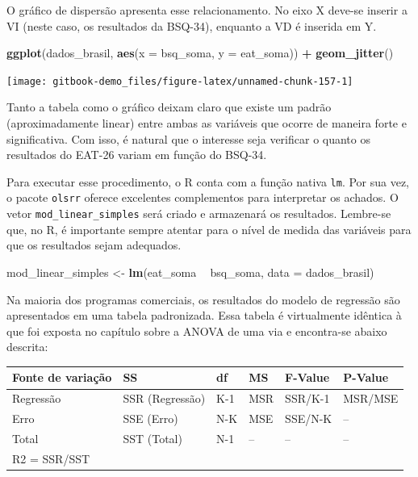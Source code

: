 \documentclass[
]{book}
\newenvironment{Shaded}{\begin{snugshade}}{\end{snugshade}}
\newcommand{\DataTypeTok}[1]{\textcolor[rgb]{0.13,0.29,0.53}{#1}}
\newcommand{\KeywordTok}[1]{\textcolor[rgb]{0.13,0.29,0.53}{\textbf{#1}}}
\newcommand{\NormalTok}[1]{#1}
\newcommand{\OperatorTok}[1]{\textcolor[rgb]{0.81,0.36,0.00}{\textbf{#1}}}
\newcommand{\StringTok}[1]{\textcolor[rgb]{0.31,0.60,0.02}{#1}}
\begin{document}
O gráfico de dispersão apresenta esse relacionamento. No eixo X deve-se inserir a VI (neste caso, os resultados da BSQ-34), enquanto a VD é inserida em Y.

\begin{Shaded}
\begin{Highlighting}[]
\KeywordTok{ggplot}\NormalTok{(dados_brasil, }\KeywordTok{aes}\NormalTok{(}\DataTypeTok{x =}\NormalTok{ bsq_soma, }\DataTypeTok{y =}\NormalTok{ eat_soma)) }\OperatorTok{+}
\StringTok{  }\KeywordTok{geom_jitter}\NormalTok{()}
\end{Highlighting}
\end{Shaded}

\begin{center}\texttt{[image: gitbook-demo\_files/figure-latex/unnamed-chunk-157-1]} \end{center}

Tanto a tabela como o gráfico deixam claro que existe um padrão (aproximadamente linear) entre ambas as variáveis que ocorre de maneira forte e significativa. Com isso, é natural que o interesse seja verificar o quanto os resultados do EAT-26 variam em função do BSQ-34.

Para executar esse procedimento, o R conta com a função nativa \texttt{lm}. Por sua vez, o pacote \texttt{olsrr} oferece excelentes complementos para interpretar os achados. O vetor \texttt{mod\_linear\_simples} será criado e armazenará os resultados. Lembre-se que, no R, é importante sempre atentar para o nível de medida das variáveis para que os resultados sejam adequados.

\begin{Shaded}
\begin{Highlighting}[]
\NormalTok{mod_linear_simples <-}\StringTok{ }\KeywordTok{lm}\NormalTok{(eat_soma }\OperatorTok{~}\StringTok{ }\NormalTok{bsq_soma, }\DataTypeTok{data =}\NormalTok{ dados_brasil)}
\end{Highlighting}
\end{Shaded}

Na maioria dos programas comerciais, os resultados do modelo de regressão são apresentados em uma tabela padronizada. Essa tabela é virtualmente idêntica à que foi exposta no capítulo sobre a ANOVA de uma via e encontra-se abaixo descrita:

\begin{longtable}[]{@{}llllll@{}}
\toprule
Fonte de variação & SS & df & MS & F-Value & P-Value\tabularnewline
\midrule
\endhead
Regressão & SSR (Regressão) & K-1 & MSR & SSR/K-1 & MSR/MSE\tabularnewline
Erro & SSE (Erro) & N-K & MSE & SSE/N-K & --\tabularnewline
Total & SST (Total) & N-1 & -- & -- & --\tabularnewline
R2 = SSR/SST & & & & &\tabularnewline
\bottomrule
\end{longtable}
\end{document}
